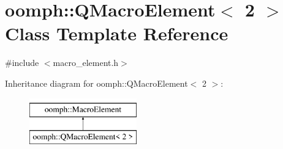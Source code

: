 \hypertarget{classoomph_1_1QMacroElement_3_012_01_4}{}\section{oomph\+:\+:Q\+Macro\+Element$<$ 2 $>$ Class Template Reference}
\label{classoomph_1_1QMacroElement_3_012_01_4}


{\ttfamily \#include $<$macro\+\_\+element.\+h$>$}

Inheritance diagram for oomph\+:\+:Q\+Macro\+Element$<$ 2 $>$\+:\begin{figure}[H]
\begin{center}
\leavevmode
\includegraphics[height=2.000000cm]{classoomph_1_1QMacroElement_3_012_01_4}
\end{center}
\end{figure}
